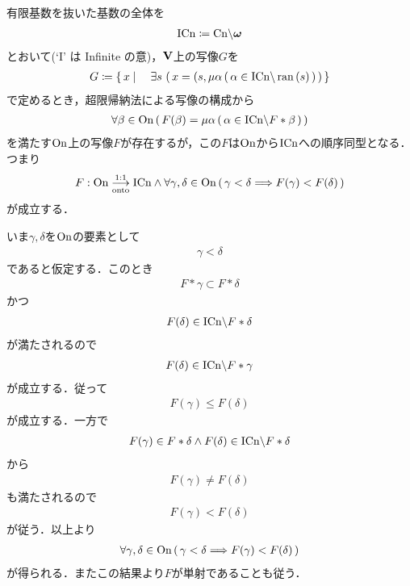 	\begin{screen}
		\begin{thm}
			有限基数を抜いた基数の全体を
			\begin{align}
				\mathrm{ICn} \coloneqq \mathrm{Cn} \backslash {\boldsymbol \omega}
			\end{align}
			とおいて(`I' は Infinite の意)，$\mathbf{V}$上の写像$G$を
			\begin{align}
				G \coloneqq \left\{\, x \mid \quad \exists s\, \left(\, x=(s,\mu \alpha\, (\, \alpha \in \mathrm{ICn} \backslash \operatorname*{ran} \left(s\right)\, )\, \right)\, \right\}
			\end{align}
			で定めるとき，超限帰納法による写像の構成から
			\begin{align}
				\forall \beta \in \mathrm{On}\, (\, F(\beta) = \mu \alpha\, (\, \alpha \in \mathrm{ICn} \backslash F \ast \beta\, )\, )
			\end{align}
			を満たす$\mathrm{On}$上の写像$F$が存在するが，この$F$は$\mathrm{On}$から$\mathrm{ICn}$への順序同型となる．つまり
			\begin{align}
				F:\mathrm{On} \underset{\mathrm{onto}}{\overset{\mathrm{1:1}}{\longrightarrow}} \mathrm{ICn} \wedge \forall \gamma, \delta \in \mathrm{On}\, (\, \gamma < \delta
				\Longrightarrow F(\gamma) < F(\delta)\, )
			\end{align}
			が成立する．
		\end{thm}
	\end{screen}
	
	\begin{sketch}
		いま$\gamma,\delta$を$\mathrm{On}$の要素として
		\begin{align}
			\gamma < \delta
		\end{align}
		であると仮定する．このとき
		\begin{align}
			F \ast \gamma \subset F \ast \delta
		\end{align}
		かつ
		\begin{align}
			F(\delta) \in \mathrm{ICn} \backslash F \ast \delta
		\end{align}
		が満たされるので
		\begin{align}
			F(\delta) \in \mathrm{ICn} \backslash F \ast \gamma
		\end{align}
		が成立する．従って
		\begin{align}
			F(\gamma) \leq F(\delta)
		\end{align}
		が成立する．一方で
		\begin{align}
			F(\gamma) \in F \ast \delta \wedge
			F(\delta) \in \mathrm{ICn} \backslash F \ast \delta
		\end{align}
		から
		\begin{align}
			F(\gamma) \neq F(\delta)
		\end{align}
		も満たされるので
		\begin{align}
			F(\gamma) < F(\delta)
		\end{align}
		が従う．以上より
		\begin{align}
			\forall \gamma, \delta \in \mathrm{On}\, (\, \gamma < \delta \Longrightarrow F(\gamma) < F(\delta)\, )
		\end{align}
		が得られる．またこの結果より$F$が単射であることも従う．
	\end{sketch}